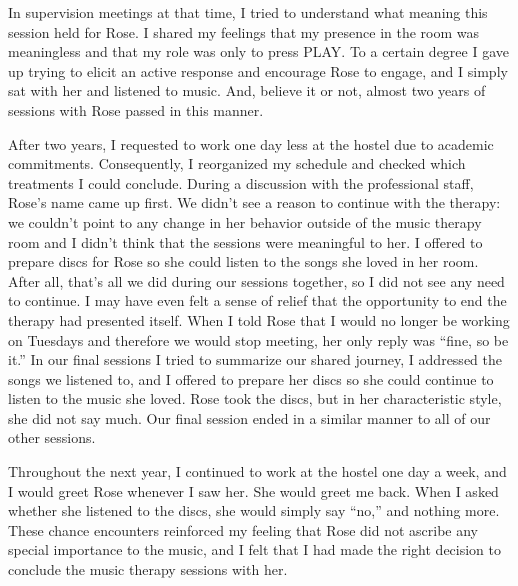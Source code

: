 \documentclass[authordate, empirical, issue]{jote-new-article}
\begin{document}
In supervision meetings at that time, I tried to understand what meaning this session held for Rose. I shared my feelings that my presence in the room was meaningless and that my role was only to press PLAY. To a certain degree I gave up trying to elicit an active response and encourage Rose to engage, and I simply sat with her and listened to music. And, believe it or not, almost two years of sessions with Rose passed in this manner.



After two years, I requested to work one day less at the hostel due to academic commitments. Consequently, I reorganized my schedule and checked which treatments I could conclude. During a discussion with the professional staff, Rose's name came up first. We didn't see a reason to continue with the therapy: we couldn't point to any change in her behavior outside of the music therapy room and I didn't think that the sessions were meaningful to her. I offered to prepare discs for Rose so she could listen to the songs she loved in her room. After all, that's all we did during our sessions together, so I did not see any need to continue. I may have even felt a sense of relief that the opportunity to end the therapy had presented itself. When I told Rose that I would no longer be working on Tuesdays and therefore we would stop meeting, her only reply was “fine, so be it.” In our final sessions I tried to summarize our shared journey, I addressed the songs we listened to, and I offered to prepare her discs so she could continue to listen to the music she loved. Rose took the discs, but in her characteristic style, she did not say much. Our final session ended in a similar manner to all of our other sessions.



Throughout the next year, I continued to work at the hostel one day a week, and I would greet Rose whenever I saw her. She would greet me back. When I asked whether she listened to the discs, she would simply say “no,” and nothing more. These chance encounters reinforced my feeling that Rose did not ascribe any special importance to the music, and I felt that I had made the right decision to conclude the music therapy sessions with her.
\end{document}
